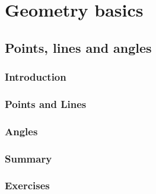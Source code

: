          \chapter{Geometry basics}
         \section{ Points, lines and angles}
            \subsection{ Introduction}
            \subsection{ Points and Lines}
            \subsection{ Angles}
            \subsection{ Summary}
            \subsection{ Exercises}
